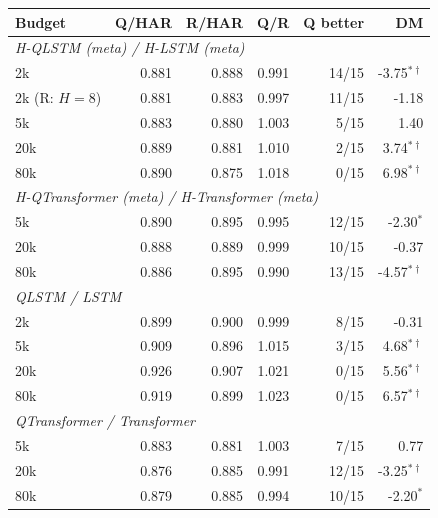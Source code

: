 \begin{tabular}{lrrrrr}
\toprule
Budget & Q/HAR & R/HAR & Q/R & Q better & DM \\
\midrule
\multicolumn{6}{l}{\emph{H-QLSTM (meta) / H-LSTM (meta)}} \\
2k & 0.881 & 0.888 & 0.991 & 14/15 & -3.75$^{*\dagger}$ \\
2k (R: $H{=}8$) & 0.881 & 0.883 & 0.997 & 11/15 & -1.18 \\
5k & 0.883 & 0.880 & 1.003 & 5/15 & 1.40 \\
20k & 0.889 & 0.881 & 1.010 & 2/15 & 3.74$^{*\dagger}$ \\
80k & 0.890 & 0.875 & 1.018 & 0/15 & 6.98$^{*\dagger}$ \\
\midrule
\multicolumn{6}{l}{\emph{H-QTransformer (meta) / H-Transformer (meta)}} \\
5k & 0.890 & 0.895 & 0.995 & 12/15 & -2.30$^{*}$ \\
20k & 0.888 & 0.889 & 0.999 & 10/15 & -0.37 \\
80k & 0.886 & 0.895 & 0.990 & 13/15 & -4.57$^{*\dagger}$ \\
\midrule
\multicolumn{6}{l}{\emph{QLSTM / LSTM}} \\
2k & 0.899 & 0.900 & 0.999 & 8/15 & -0.31 \\
5k & 0.909 & 0.896 & 1.015 & 3/15 & 4.68$^{*\dagger}$ \\
20k & 0.926 & 0.907 & 1.021 & 0/15 & 5.56$^{*\dagger}$ \\
80k & 0.919 & 0.899 & 1.023 & 0/15 & 6.57$^{*\dagger}$ \\
\midrule
\multicolumn{6}{l}{\emph{QTransformer / Transformer}} \\
5k & 0.883 & 0.881 & 1.003 & 7/15 & 0.77 \\
20k & 0.876 & 0.885 & 0.991 & 12/15 & -3.25$^{*\dagger}$ \\
80k & 0.879 & 0.885 & 0.994 & 10/15 & -2.20$^{*}$ \\
\bottomrule
\end{tabular}
